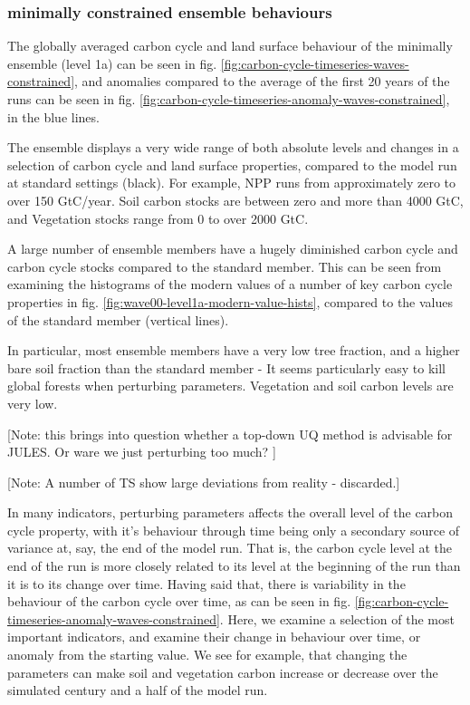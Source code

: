 \documentclass[gmd, manuscript]{copernicus}
\begin{document}
\subsubsection{minimally constrained ensemble behaviours}

The globally averaged carbon cycle and land surface behaviour of the minimally ensemble (level 1a) can be seen in fig. \ref{fig:carbon-cycle-timeseries-waves-constrained}, and anomalies compared to the average of the first 20 years of the runs can be seen in fig. \ref{fig:carbon-cycle-timeseries-anomaly-waves-constrained}, in the blue lines.

The ensemble displays a very wide range of both absolute levels and changes in a selection of carbon cycle and land surface properties, compared to the model run at standard settings (black). For example, NPP runs from approximately zero to over 150 GtC/year. Soil carbon stocks are between zero and more than 4000 GtC, and Vegetation stocks range from 0 to over 2000 GtC.

A large number of ensemble members have a hugely diminished carbon cycle and carbon cycle stocks compared to the standard member. This can be seen from examining the histograms of the modern values of a number of key carbon cycle properties in fig. \ref{fig:wave00-level1a-modern-value-hists}, compared to the values of the standard member (vertical lines).

In particular, most ensemble members have a very low tree fraction, and a higher bare soil fraction than the standard member - It seems particularly easy to kill global forests when perturbing parameters. Vegetation and soil carbon levels are very low. 

[Note: this brings into question whether a top-down UQ method is advisable for JULES. Or ware we just perturbing too much? ]

[Note: A number of TS show large deviations from reality - discarded.]

In many indicators, perturbing parameters affects the overall level of the carbon cycle property, with it's behaviour through time being only a secondary source of variance at, say, the end of the model run. That is, the carbon cycle level at the end of the run is more closely related to its level at the beginning of the run than it is to its change over time. Having said that, there is variability in the behaviour of the carbon cycle over time, as can be seen in fig. \ref{fig:carbon-cycle-timeseries-anomaly-waves-constrained}. Here, we examine a selection of the most important indicators, and examine their change in behaviour over time, or anomaly from the starting value. We see for example, that changing the parameters can make soil and vegetation carbon increase or decrease over the simulated century and a half of the model run. 
\end{document}

